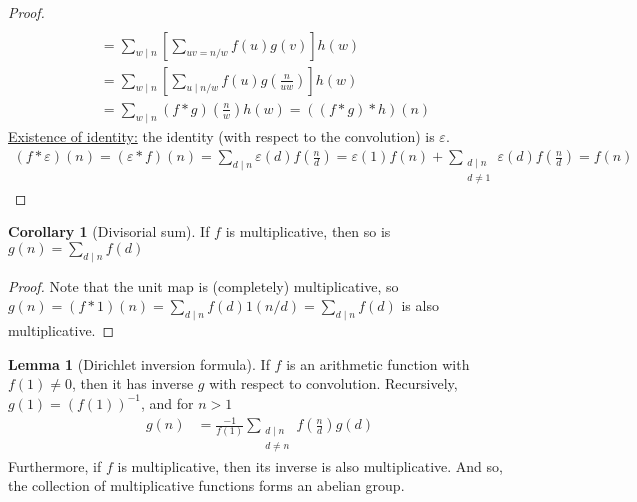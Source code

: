 \documentclass{article}
\theoremstyle{definition}
\newtheorem{corollary}[theorem]{Corollary}
\newtheorem{lemma}[theorem]{Lemma}
\begin{document}
\begin{proof}
\begin{align*}
\\
& = \sum_{w \mid n} \left[ \sum_{uv=n/w} f \left( u \right) g \left( v \right) \right] h \left( w \right)
\\
& = \sum_{w \mid n} \left[ \sum_{u \mid n/w} f \left( u \right) g \left( \frac{n}{uw} \right) \right] h \left( w \right)
\\
& = \sum_{w \mid n} (f*g) \left( \frac{n}{w} \right) h \left( w \right) = ((f*g)*h) (n)
\end{align*}
\underline{Existence of identity:} the identity (with respect to the convolution) is $\varepsilon$.
\begin{align*}
(f * \varepsilon) (n) = (\varepsilon * f) (n) = \sum_{d \mid n} \varepsilon(d) f \left( \frac{n}{d} \right) = \varepsilon(1) f(n) + \sum_{\substack{d \mid n \\ d \neq 1}} \varepsilon(d) f \left( \frac{n}{d} \right) = f(n)
\end{align*}
\end{proof}
\begin{corollary}[Divisorial sum]
If $f$ is multiplicative, then so is $g(n) = \sum_{d \mid n} f(d)$
\end{corollary}
\begin{proof}
Note that the unit map is (completely) multiplicative, so $g(n) = (f * 1) (n) = \sum_{d \mid n} f(d) 1(n/d) = \sum_{d \mid n} f(d)$ is also multiplicative.
\end{proof}
\begin{lemma}[Dirichlet inversion formula] \label{dirichlet-inv-form}
If $f$ is an arithmetic function with $f(1) \neq 0$, then it has inverse $g$ with respect to convolution. Recursively, $g(1) = (f(1))^{-1}$, and for $n > 1$
\begin{align*}
g(n) & = \frac{-1}{f(1)} \sum_{\substack{d \mid n \\ d \neq n}} f \left( \frac{n}{d} \right) g \left( d \right)
\end{align*}
Furthermore, if $f$ is multiplicative, then its inverse is also multiplicative. And so, the collection of multiplicative functions forms an abelian group. 
\end{lemma}
\end{document}
